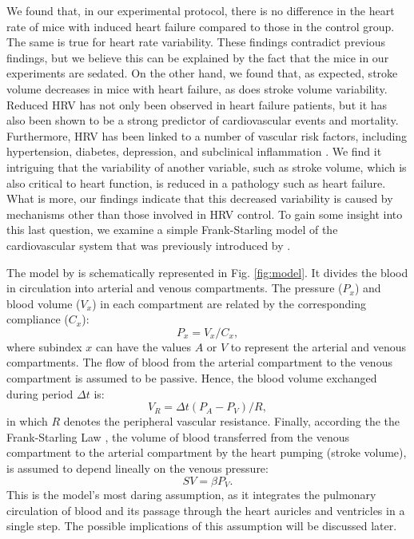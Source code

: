 \documentclass[%
preprint,
 amsmath,amssymb,
 aps,
]{revtex4-2}
\begin{document}
We found that, in our experimental protocol, there is no difference in the heart rate of mice with induced heart failure compared to those in the control group. The same is true for heart rate variability. These findings contradict previous findings, but we believe this can be explained by the fact that the mice in our experiments are sedated. On the other hand, we found that, as expected, stroke volume decreases in mice with heart failure, as does stroke volume variability. Reduced HRV has not only been observed in heart failure patients, but it has also been shown to be a strong predictor of cardiovascular events and mortality. Furthermore, HRV has been linked to a number of vascular risk factors, including hypertension, diabetes, depression, and subclinical inflammation \citep{Zeki_Al_Hazzouri_2014}. We find it intriguing that the variability of another variable, such as stroke volume, which is also critical to heart function, is reduced in a pathology such as heart failure. What is more, our findings indicate that this decreased variability is caused by mechanisms other than those involved in HRV control. To gain some insight into this last question, we examine a simple Frank-Starling model of the cardiovascular system that was previously introduced by \citet{Upton_2005}.

The model by \citeauthor{Upton_2005} is schematically represented in Fig. \ref{fig:model}. It divides the blood in circulation into arterial and venous compartments. The pressure ($P_x$) and blood volume ($V_x$) in each compartment are related by the corresponding compliance ($C_x$):
\[
    P_x = V_x / C_x,
\] 
where subindex $x$ can have the values $A$ or $V$ to represent the arterial and venous compartments. The flow of blood from the arterial compartment to the venous compartment is assumed to be passive. Hence, the blood volume exchanged during period $\Delta t$ is:
\[
    V_R = \Delta t (P_A - P_V) / R,
\]
in which $R$ denotes the peripheral vascular resistance. Finally, according the the Frank-Starling Law \citep{Jacob_1992}, the volume of blood transferred from the venous compartment to the arterial compartment by the heart pumping (stroke volume), is assumed to depend lineally on the venous pressure:
\[
    SV = \beta P_V.
\]
This is the model's most daring assumption, as it integrates the pulmonary circulation of blood and its passage through the heart auricles and ventricles in a single step. The possible implications of this assumption will be discussed later.
\end{document}

